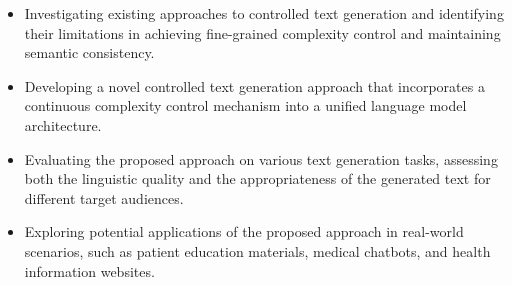 \begin{itemize}
\item Investigating existing approaches to controlled text generation and identifying their limitations in achieving fine-grained complexity control and maintaining semantic consistency.
\item Developing a novel controlled text generation approach that incorporates a continuous complexity control mechanism into a unified language model architecture.
\item Evaluating the proposed approach on various text generation tasks, assessing both the linguistic quality and the appropriateness of the generated text for different target audiences.
\item Exploring potential applications of the proposed approach in real-world scenarios, such as patient education materials, medical chatbots, and health information websites.
\end{itemize}